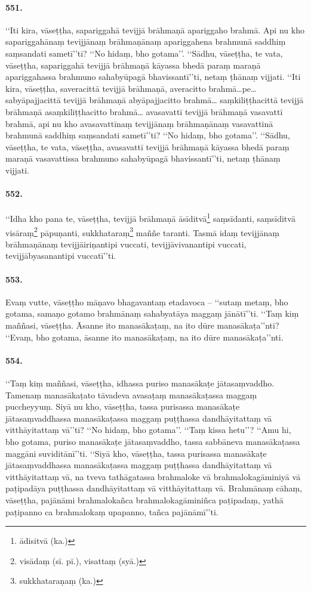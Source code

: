 \paragraph{551.} ‘‘Iti kira, vāseṭṭha, sapariggahā tevijjā brāhmaṇā apariggaho brahmā. Api nu kho sapariggahānaṃ tevijjānaṃ brāhmaṇānaṃ apariggahena brahmunā saddhiṃ saṃsandati sametī’’ti? ‘‘No hidaṃ, bho gotama’’. ‘‘Sādhu, vāseṭṭha, te vata, vāseṭṭha, sapariggahā tevijjā brāhmaṇā kāyassa bhedā paraṃ maraṇā apariggahassa brahmuno sahabyūpagā bhavissantī’’ti, netaṃ ṭhānaṃ vijjati. ‘‘Iti kira, vāseṭṭha, saveracittā tevijjā brāhmaṇā, averacitto brahmā…pe… sabyāpajjacittā tevijjā brāhmaṇā abyāpajjacitto brahmā… saṃkiliṭṭhacittā tevijjā brāhmaṇā asaṃkiliṭṭhacitto brahmā… avasavattī tevijjā brāhmaṇā vasavattī brahmā, api nu kho avasavattīnaṃ tevijjānaṃ brāhmaṇānaṃ vasavattinā brahmunā saddhiṃ saṃsandati sametī’’ti? ‘‘No hidaṃ, bho gotama’’. ‘‘Sādhu, vāseṭṭha, te vata, vāseṭṭha, avasavattī tevijjā brāhmaṇā kāyassa bhedā paraṃ maraṇā vasavattissa brahmuno sahabyūpagā bhavissantī’’ti, netaṃ ṭhānaṃ vijjati.

\paragraph{552.} ‘‘Idha kho pana te, vāseṭṭha, tevijjā brāhmaṇā āsīditvā\footnote{ādisitvā (ka.)} saṃsīdanti, saṃsīditvā visāraṃ\footnote{visādaṃ (sī. pī.), visattaṃ (syā.)} pāpuṇanti, sukkhataraṃ\footnote{sukkhataraṇaṃ (ka.)} maññe taranti. Tasmā idaṃ tevijjānaṃ brāhmaṇānaṃ tevijjāiriṇantipi vuccati, tevijjāvivanantipi vuccati, tevijjābyasanantipi vuccatī’’ti.

\paragraph{553.} Evaṃ vutte, vāseṭṭho māṇavo bhagavantaṃ etadavoca – ‘‘sutaṃ metaṃ, bho gotama, samaṇo gotamo brahmānaṃ sahabyatāya maggaṃ jānātī’’ti. ‘‘Taṃ kiṃ maññasi, vāseṭṭha. Āsanne ito manasākaṭaṃ, na ito dūre manasākaṭa’’nti? ‘‘Evaṃ, bho gotama, āsanne ito manasākaṭaṃ, na ito dūre manasākaṭa’’nti.

\paragraph{554.} ‘‘Taṃ kiṃ maññasi, vāseṭṭha, idhassa puriso manasākaṭe jātasaṃvaddho. Tamenaṃ manasākaṭato tāvadeva avasaṭaṃ manasākaṭassa maggaṃ puccheyyuṃ. Siyā nu kho, vāseṭṭha, tassa purisassa manasākaṭe jātasaṃvaddhassa manasākaṭassa maggaṃ puṭṭhassa dandhāyitattaṃ vā vitthāyitattaṃ vā’’ti? ‘‘No hidaṃ, bho gotama’’. ‘‘Taṃ kissa hetu’’? ‘‘Amu hi, bho gotama, puriso manasākaṭe jātasaṃvaddho, tassa sabbāneva manasākaṭassa maggāni suviditānī’’ti. ‘‘Siyā kho, vāseṭṭha, tassa purisassa manasākaṭe jātasaṃvaddhassa manasākaṭassa maggaṃ puṭṭhassa dandhāyitattaṃ vā vitthāyitattaṃ vā, na tveva tathāgatassa brahmaloke vā brahmalokagāminiyā vā paṭipadāya puṭṭhassa dandhāyitattaṃ vā vitthāyitattaṃ vā. Brahmānaṃ cāhaṃ, vāseṭṭha, pajānāmi brahmalokañca brahmalokagāminiñca paṭipadaṃ, yathā paṭipanno ca brahmalokaṃ upapanno, tañca pajānāmī’’ti.

